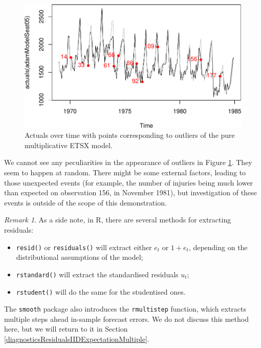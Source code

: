 \documentclass[
]{book}
\providecommand{\tightlist}{%
  \setlength{\itemsep}{0pt}\setlength{\parskip}{0pt}}
\theoremstyle{definition}
\theoremstyle{definition}
\theoremstyle{definition}
\theoremstyle{definition}
\theoremstyle{remark}
\newtheorem*{remark}{Remark}
\begin{document}
\begin{figure}
\centering
\includegraphics{Svetunkov--2022----ADAM_files/figure-latex/adamModelSeat05Outliers-1.pdf}
\caption{\label{fig:adamModelSeat05Outliers}Actuals over time with points corresponding to outliers of the pure multiplicative ETSX model.}
\end{figure}

We cannot see any peculiarities in the appearance of outliers in Figure \ref{fig:adamModelSeat05Outliers}. They seem to happen at random. There might be some external factors, leading to those unexpected events (for example, the number of injuries being much lower than expected on observation 156, in November 1981), but investigation of these events is outside of the scope of this demonstration.

\begin{remark}
As a side note, in R, there are several methods for extracting residuals:

\begin{itemize}
\tightlist
\item
  \texttt{resid()} or \texttt{residuals()} will extract either \(e_t\) or \(1+e_t\), depending on the distributional assumptions of the model;
\item
  \texttt{rstandard()} will extract the standardised residuals \(u_t\);
\item
  \texttt{rstudent()} will do the same for the studentised ones.
\end{itemize}

The \texttt{smooth} package also introduces the \texttt{rmultistep} function, which extracts multiple steps ahead in-sample forecast errors. We do not discuss this method here, but we will return to it in Section \ref{diagnosticsResidualsIIDExpectationMultiple}.
\end{remark}
\end{document}

